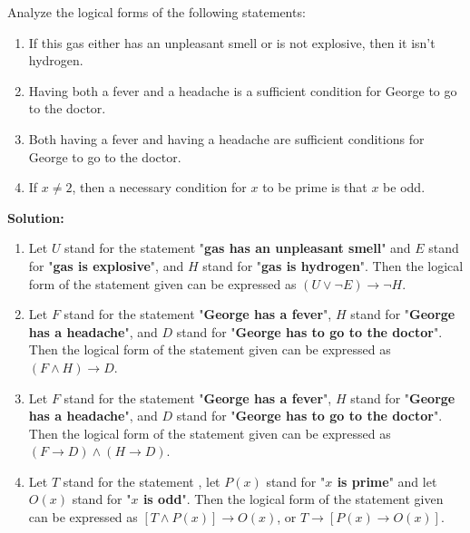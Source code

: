 Analyze the logical forms of the following statements:
\begin{enumerate}[label=(\alph*)]
    \item If this gas either has an unpleasant smell or is not explosive, then it isn't hydrogen.
    \item Having both a fever and a headache is a sufficient condition for George to go to the doctor.
    \item Both having a fever and having a headache are sufficient conditions for George to go to the doctor.
    \item If $x \neq 2$, then a necessary condition for $x$ to be prime is that $x$ be odd.
\end{enumerate}

\textbf{Solution:}
\begin{enumerate}[label=(\alph*)]
    \item Let $U$ stand for the statement "\textbf{gas has an unpleasant smell}" and $E$ stand for "\textbf{gas is explosive}", and $H$ stand for "\textbf{gas is hydrogen}". Then the logical form of the statement given can be expressed as $(U \vee \neg E) \rightarrow \neg H$.
    \item Let $F$ stand for the statement "\textbf{George has a fever}", $H$ stand for "\textbf{George has a headache}", and $D$ stand for "\textbf{George has to go to the doctor}". Then the logical form of the statement given can be expressed as $(F \wedge H)\rightarrow D$.
    \item Let $F$ stand for the statement "\textbf{George has a fever}", $H$ stand for "\textbf{George has a headache}", and $D$ stand for "\textbf{George has to go to the doctor}". Then the logical form of the statement given can be expressed as $(F \rightarrow D) \wedge (H \rightarrow D)$.
    \item Let $T$ stand for the statement , let $P(x)$ stand for "\textbf{$x$ is prime}" and let $O(x)$ stand for "\textbf{$x$ is odd}". Then the logical form of the statement given can be expressed as $[T \wedge P(x)] \rightarrow O(x)$, or $T \rightarrow [P(x) \rightarrow O(x)]$.
\end{enumerate}
\pagebreak